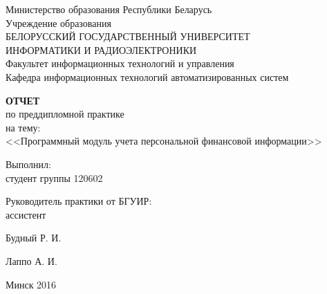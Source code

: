 \begin{titlepage}
\thispagestyle{empty}
\setlength{\parindent}{0mm} %

\begin{center}
  Министерство образования Республики Беларусь \\
  \smallskip
  Учреждение образования \\
  БЕЛОРУССКИЙ ГОСУДАРСТВЕННЫЙ УНИВЕРСИТЕТ \\
  ИНФОРМАТИКИ И РАДИОЭЛЕКТРОНИКИ \\
  \smallskip
  Факультет информационных технологий и управления \\
  \smallskip
  Кафедра информационных технологий автоматизированных систем
\end{center}

\vspace{40mm}

\begin{center}
  \textbf{ОТЧЕТ} \\
  по преддипломной практике \\
  на тему: \\
  <<Программный модуль учета персональной финансовой информации>>
\end{center}

\vspace{30mm}

\begin{minipage}{.75\linewidth}
    Выполнил: \\
    студент группы 120602

    \bigskip

    Руководитель практики от БГУИР: \\
    ассистент
\end{minipage}
\hfill
\begin{minipage}{.2\linewidth}
  \vspace{6mm}
  Будный Р. И.

  \vspace{12mm}
  Лаппо А. И.
\end{minipage}

\vfill

\begin{center}
  Минск 2016
\end{center}

\setlength{\parindent}{1.25cm} %
\end{titlepage}